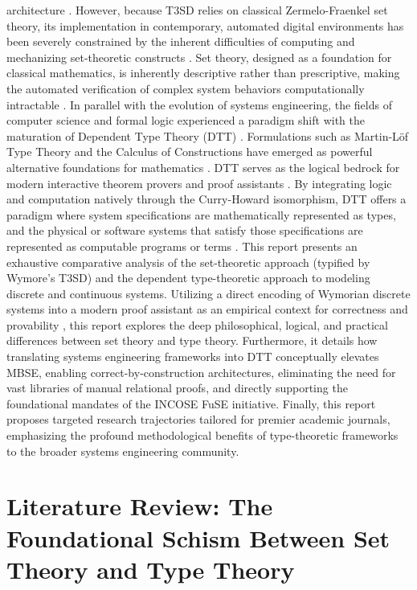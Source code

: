 \documentclass[11pt]{article}
\begin{document}
architecture \parencite{Ref11, Ref13, Ref14}. However, because T3SD relies on classical Zermelo-Fraenkel set theory, its implementation in contemporary, automated digital environments has been severely constrained by the inherent difficulties of computing and mechanizing set-theoretic constructs \parencite{Ref15, Ref16}. Set theory, designed as a foundation for classical mathematics, is inherently descriptive rather than prescriptive, making the automated verification of complex system behaviors computationally intractable \parencite{Ref17}. In parallel with the evolution of systems engineering, the fields of computer science and formal logic experienced a paradigm shift with the maturation of Dependent Type Theory (DTT) \parencite{Ref18, Ref19}. Formulations such as Martin-Löf Type Theory and the Calculus of Constructions have emerged as powerful alternative foundations for mathematics \parencite{Ref18, Ref20}. DTT serves as the logical bedrock for modern interactive theorem provers and proof assistants \parencite{Ref19, Ref21, Ref22}. By integrating logic and computation natively through the Curry-Howard isomorphism, DTT offers a paradigm where system specifications are mathematically represented as types, and the physical or software systems that satisfy those specifications are represented as computable programs or terms \parencite{Ref22}. This report presents an exhaustive comparative analysis of the set-theoretic approach (typified by Wymore's T3SD) and the dependent type-theoretic approach to modeling discrete and continuous systems. Utilizing a direct encoding of Wymorian discrete systems into a modern proof assistant as an empirical context for correctness and provability \parencite{Ref23, Ref23}, this report explores the deep philosophical, logical, and practical differences between set theory and type theory. Furthermore, it details how translating systems engineering frameworks into DTT conceptually elevates MBSE, enabling correct-by-construction architectures, eliminating the need for vast libraries of manual relational proofs, and directly supporting the foundational mandates of the INCOSE FuSE initiative. Finally, this report proposes targeted research trajectories tailored for premier academic journals, emphasizing the profound methodological benefits of type-theoretic frameworks to the broader systems engineering community.

\section{Literature Review: The Foundational Schism Between Set Theory and Type Theory}
\end{document}
